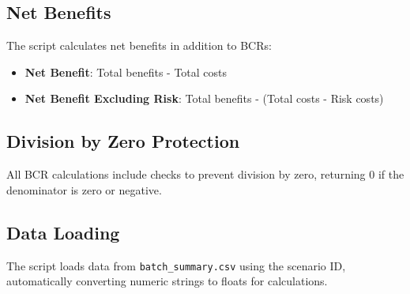 \documentclass[ctcc_full_documentation.tex]{subfiles}
\begin{document}
\subsection{Net Benefits}

The script calculates net benefits in addition to BCRs:
\begin{itemize}
    \item \textbf{Net Benefit}: Total benefits - Total costs
    \item \textbf{Net Benefit Excluding Risk}: Total benefits - (Total costs - Risk costs)
\end{itemize}

\subsection{Division by Zero Protection}

All BCR calculations include checks to prevent division by zero, returning 0 if the denominator is zero or negative.

\subsection{Data Loading}

The script loads data from \texttt{batch\_summary.csv} using the scenario ID, automatically converting numeric strings to floats for calculations.
\end{document}
